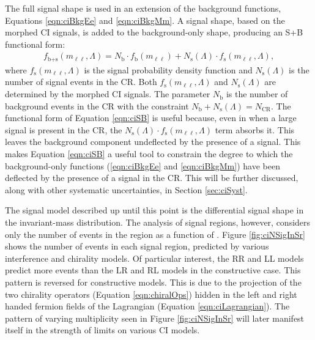 The full signal shape is used in an extension of the background functions, Equations \ref{eqn:ciBkgEe} and \ref{eqn:ciBkgMm}.
A signal shape, based on the morphed CI signals, is added to the background-only shape, producing an S+B functional form:
\begin{align}
\label{eqn:ciSB}
f_\textrm{b+s}(m_{\ell\ell},\Lambda) = N_\textrm{b}\cdot f_\textrm{b}(m_{\ell\ell}) + N_\textrm{s}(\Lambda)\cdot f_\textrm{s}(m_{\ell\ell},\Lambda),
\end{align}
where $f_\textrm{s}(m_{\ell\ell},\Lambda)$ is the signal probability density function and $N_\textrm{s}(\Lambda)$ is the number of signal events in the CR.
Both $f_\textrm{s}(m_{\ell\ell},\Lambda)$ and $N_\textrm{s}(\Lambda)$ are determined by the morphed CI signals.
The parameter $N_\textrm{b}$ is the number of background events in the CR with the constraint $N_\textrm{b}+N_\textrm{s}(\Lambda)=N_\textrm{CR}$.
The functional form of Equation \ref{eqn:ciSB} is useful because, even in when a large signal is present in the CR, the $N_\textrm{s}(\Lambda)\cdot f_\textrm{s}(m_{\ell\ell},\Lambda)$ term absorbs it.
This leaves the background component undeflected by the presence of a signal.
This makes Equation \ref{eqn:ciSB} a useful tool to constrain the degree to which the background-only functions (\ref{eqn:ciBkgEe} and \ref{eqn:ciBkgMm}) have been deflected by the presence of a signal in the CR.
This will be further discussed, along with other systematic uncertainties, in Section \ref{sec:ciSyst}.

The signal model described up until this point is the differential signal shape in the invariant-mass distribution.
The analysis of signal regions, however, considers only the number of events in the region as a function of \lam.
Figure \ref{fig:ciNSigInSr} shows the number of events in each signal region, predicted by various interference and chirality models.
Of particular interest, the RR and LL models predict more events than the LR and RL models in the constructive case.
This pattern is reversed for constructive models.
This is due to the projection of the two chirality operators (Equation \ref{eqn:chiralOps}) hidden in the left and right handed fermion fields of the Lagrangian (Equation \ref{eqn:ciLagrangian}).
The pattern of varying multiplicity seen in Figure \ref{fig:ciNSigInSr} will later manifest itself in the strength of limits on various CI models.

